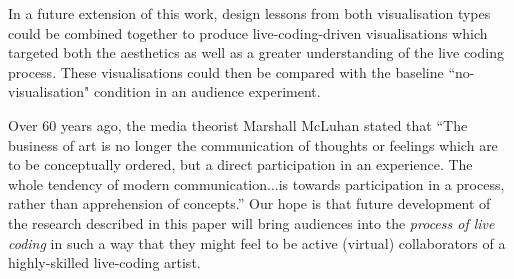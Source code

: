 \documentclass{sig-alternate}
\begin{document}

In a future extension of this work, design lessons from both visualisation types could be combined together to produce live-coding-driven visualisations which targeted both the aesthetics as well as a greater understanding of the live coding process. These visualisations could then be compared with the baseline ``no-visualisation" condition in an audience experiment.  


Over 60 years ago, the media theorist Marshall McLuhan stated that ``The business of art is no longer the communication of thoughts or feelings which are to be conceptually ordered, but a direct participation in an experience. The whole tendency of modern communication...is towards participation in a process, rather than apprehension of concepts.'' \cite{McLuhan} Our hope is that future development of the research described in this paper will bring audiences into the {\em process of live coding} in such a way that they might feel to be active (virtual) collaborators of a highly-skilled live-coding artist.




%

\end{document}
